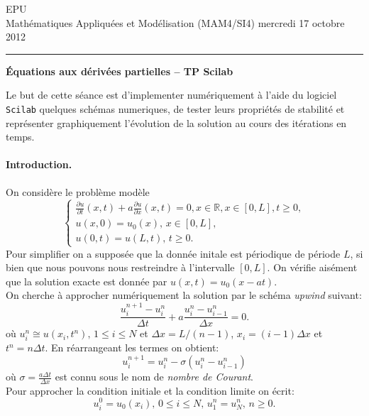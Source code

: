 \documentclass[12pt,a4paper]{article}
\begin{document}
 \hfill EPU\\
\noindent Math\'ematiques Appliqu\'ees et Mod\'elisation (MAM4/SI4) \hfill mercredi 17 octobre 2012 \\

\hrule

\bigskip
\bigskip

\begin{center}{\bf \'Equations aux d\'eriv\'ees partielles -- TP Scilab}\end{center}

\bigskip

\noindent Le but de cette s\'eance est d'implementer num\'eriquement \`a l'aide
du logiciel \texttt{Scilab} quelques sch\'emas numeriques, de tester
leurs propri\'et\'es de stabilit\'e et repr\'esenter graphiquement
l'\'evolution de la solution au cours des it\'erations en temps.

\paragraph{Introduction.} On consid\`ere le probl\`eme mod\`ele 
$$
\left\{\begin{array}{l}
\displaystyle \frac{\partial u}{\partial t}(x,t)+a\frac{\partial
  u}{\partial x}(x,t)=0,x\in\mathbb{R},x\in[0,L], t\ge 0,\\
\displaystyle u(x,0)=u_0(x),\,x\in [0,L],\\
u(0,t)=u(L,t),\,t\ge 0.
\end{array}\right.
$$
Pour simplifier on a suppos\'ee que la donn\'ee initale
est p\'eriodique de p\'eriode $L$, si bien que nous pouvons nous
restreindre \`a l'intervalle $[0,L]$. On v\'erifie ais\'ement que la
solution exacte est donn\'ee par $u(x,t)=u_0(x-at)$.\\

\noindent On cherche \`a approcher num\'eriquement la solution par le sch\'ema {\it upwind} suivant:
$$
\frac{u_i^{n+1}-u_i^n}{\Delta t}+a\frac{u_i^n-u_{i-1}^n}{\Delta x}=0.
$$ 
o\`u $u_i^n\cong u(x_i,t^n),\,1\le i\le N$ et $\Delta x=L/(n-1)$,
$x_i=(i-1)\Delta x$ et $t^n = n\Delta t$. En r\'earrangeant les termes
on obtient:
$$
u_i^{n+1}=u_i^n-\sigma(u_i^n-u_{i-1}^n)
$$
o\`u $\sigma=\displaystyle\frac{a\Delta t}{\Delta x}$ est connu sous le nom de {\it nombre de Courant}.\\
Pour approcher la condition initiale et la condition limite on \'ecrit:
$$
u_i^0=u_0(x_i),\,0\le i\le N,\, u_1^n = u_N^n,\,n\ge 0.
$$
\end{document}
